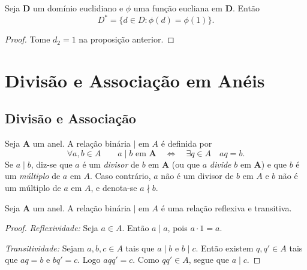 \begin{prop}
	Seja $\bm D$ um domínio euclidiano e $\phi$ uma função eucliana em $\bm D$. Então
	\begin{equation*}
	D^* = \{d \in D : \phi(d)=\phi(1)\}.
	\end{equation*}
\end{prop}
\begin{proof}
	Tome $d_2=1$ na proposição anterior.
\end{proof}




\section{Divisão e Associação em Anéis}

\subsection{Divisão e Associação}

\begin{defi}
	Seja $\bm A$ um anel. A relação binária $\mid$ em $A$ é definida por
	\begin{equation*}
	\forall a,b \in A \qquad a \mid b \text{\ \ em\ \ } \bm A \quad \Leftrightarrow \quad \exists q \in A \quad aq=b.
	\end{equation*}
	Se $a \mid b$, diz-se que $a$ é um \emph{divisor} de $b$ em $\bm A$ (ou que $a$ \emph{divide} $b$ em $\bm A$) e que $b$ é um \emph{múltiplo} de $a$ em $A$. Caso contrário, $a$ não é um divisor de $b$ em $A$ e $b$ não é um múltiplo de $a$ em $A$, e denota-se $a \nmid b$.
\end{defi}

\begin{prop}
	Seja $\bm A$ um anel. A relação binária $\mid$ em $A$ é uma relação reflexiva e transitiva.
\end{prop}
\begin{proof}
	\emph{Reflexividade:} Seja $a \in A$. Então $a \mid a$, pois $a \cdot 1 = a$.

	\emph{Transitividade:} Sejam $a,b,c \in A$ tais que $a \mid b$ e $b \mid c$. Então existem $q,q' \in A$ tais que $aq=b$ e $bq'=c$. Logo $aqq'=c$. Como $qq' \in A$, segue que $a \mid c$.
\end{proof}

